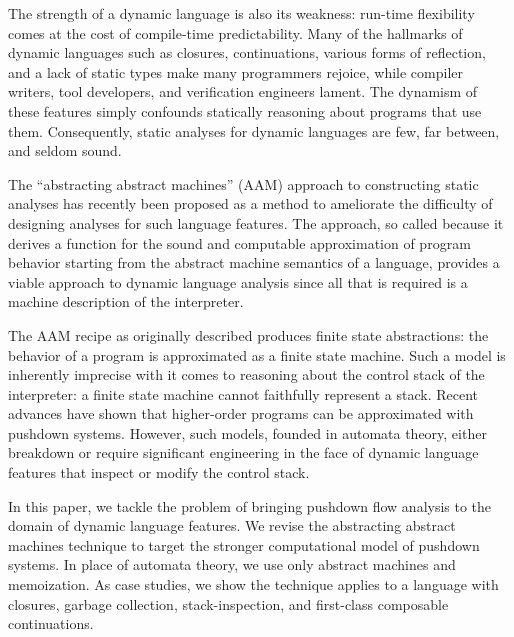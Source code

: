 The strength of a dynamic language is also its weakness: run-time
flexibility comes at the cost of compile-time predictability.
%
Many of the hallmarks of dynamic languages such as closures,
continuations, various forms of reflection, and a lack of static types
make many programmers rejoice, while compiler writers, tool
developers, and verification engineers lament.
%
The dynamism of these features simply confounds statically reasoning
about programs that use them.
%
Consequently, static analyses for dynamic languages are few, far
between, and seldom sound.

The ``abstracting abstract machines'' (AAM) approach to constructing
static analyses has recently been proposed as a method to ameliorate
the difficulty of designing analyses for such language features.
%
The approach, so called because it derives a function for the sound
and computable approximation of program behavior starting from the
abstract machine semantics of a language, provides a viable approach
to dynamic language analysis since all that is required is a machine
description of the interpreter.


The AAM recipe as originally described produces finite state
abstractions: the behavior of a program is approximated as a finite
state machine.
%
Such a model is inherently imprecise with it comes to reasoning about
the control stack of the interpreter: a finite state machine cannot
faithfully represent a stack.
%
Recent advances have shown that higher-order programs can be
approximated with pushdown systems.
%
However, such models, founded in automata theory, either breakdown or
require significant engineering in the face of dynamic language
features that inspect or modify the control stack.

In this paper, we tackle the problem of bringing pushdown flow
analysis to the domain of dynamic language features.  We revise the
abstracting abstract machines technique to target the stronger
computational model of pushdown systems.
%
In place of automata theory, we use only abstract machines and
memoization.
%
As case studies, we show the technique applies to a language with
closures, garbage collection, stack-inspection, and first-class
composable continuations.
